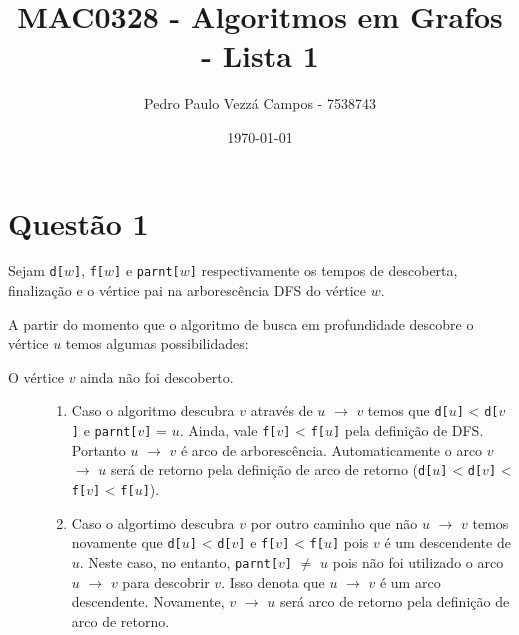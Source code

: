 \documentclass[12pt, a4paper, oneside]{article}
\title{\large{MAC0328 - Algoritmos em Grafos - Lista 1}}
\author{Pedro Paulo Vezzá Campos - 7538743}
\date{\today}
\begin{document}
\maketitle

\section*{Questão 1} Sejam \texttt{d[$w$]}, \texttt{f[$w$]} e \texttt{parnt[$w$]}
respectivamente os tempos de descoberta, finalização e o vértice pai na
arborescência DFS do vértice $w$.

A partir do momento que o algoritmo de busca em profundidade descobre o vértice
$u$ temos algumas possibilidades:
\begin{description}
  \item [O vértice $v$ ainda não foi descoberto.] \hfill
  	\begin{enumerate}
  		\item Caso o algoritmo descubra $v$ através de $u$ $\rightarrow$ $v$ temos que
  			\texttt{d[$u$]} < \texttt{d[$v$]} e \texttt{parnt[$v$]} = $u$. Ainda, vale
  			\texttt{f[$v$]} < \texttt{f[$u$]} pela definição de DFS. Portanto $u$
  			$\rightarrow$ $v$ é arco de arborescência. Automaticamente o arco $v$
  			$\rightarrow$ $u$ será de retorno pela definição de arco de retorno
  			(\texttt{d[$u$]} < \texttt{d[$v$]} < \texttt{f[$v$]} < \texttt{f[$u$]}).
		\item Caso o algortimo descubra $v$ por outro caminho que não $u$ $\rightarrow$ $v$
			temos novamente que \texttt{d[$u$]} < \texttt{d[$v$]} e \texttt{f[$v$]} <
			\texttt{f[$u$]} pois $v$ é um descendente de $u$. Neste caso, no entanto,
			\texttt{parnt[$v$]} $\ne$ $u$ pois não foi utilizado o arco $u$ $\rightarrow$ $v$ para
			descobrir $v$. Isso denota que $u$ $\rightarrow$ $v$ é um arco descendente.
			Novamente, $v$ $\rightarrow$ $u$ será arco de retorno pela definição de arco de
		retorno.
	\end{enumerate}
\end{description}
\end{document}
